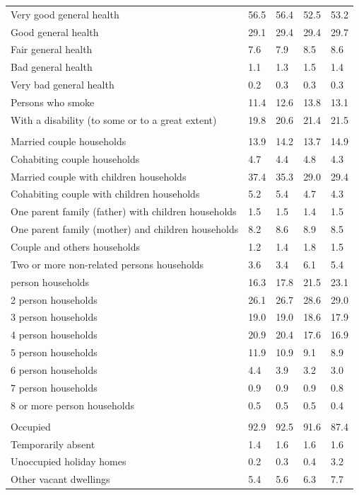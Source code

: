 \documentclass{article}
\begin{document}
\begin{table}[h]
\begin{tabular}{KTTTT}
    \hline
Very good general health & 56.5& 56.4&52.5& 53.2\\
Good general health & 29.1& 29.4& 29.4& 29.7\\
Fair general health & 7.6& 7.9&8.5& 8.6\\
Bad general health & 1.1& 1.3&1.5& 1.4\\
Very bad general health & 0.2& 0.3&0.3& 0.3\\
    \hline
Persons who smoke & 11.4& 12.6&13.8& 13.1\\
    \hline
With a disability (to some or to a great extent) & 19.8& 20.6&21.4& 21.5\\
\hline
    \\ 
    \hline
Married couple households & 13.9& 14.2& 13.7& 14.9\\
Cohabiting couple households & 4.7& 4.4& 4.8& 4.3\\
Married couple with children households & 37.4& 35.3& 29.0& 29.4\\
Cohabiting couple with children households & 5.2& 5.4& 4.7& 4.3\\
One parent family (father) with  children households & 1.5& 1.5& 1.4& 1.5\\
One parent family (mother) and children households & 8.2& 8.6& 8.9& 8.5\\
Couple and others households  & 1.2& 1.4& 1.8& 1.5\\
Two or more non-related persons households & 3.6& 3.4& 6.1& 5.4\\
     person households & 16.3& 17.8& 21.5& 23.1\\
2 person households & 26.1& 26.7& 28.6& 29.0\\
3 person households & 19.0& 19.0& 18.6& 17.9\\
4 person households & 20.9& 20.4& 17.6& 16.9\\
5 person households & 11.9& 10.9&  9.1&  8.9\\
6 person households & 4.4& 3.9& 3.2& 3.0\\
7 person households & 0.9& 0.9& 0.9& 0.8\\
8 or more person households & 0.5& 0.5& 0.5& 0.4\\
\hline
    \\ 
    \hline
Occupied & 92.9& 92.5& 91.6& 87.4\\
Temporarily absent & 1.4& 1.6& 1.6& 1.6\\
Unoccupied holiday homes & 0.2& 0.3& 0.4& 3.2\\
Other vacant dwellings & 5.4& 5.6& 6.3& 7.7\\
\hline
\end{tabular}
\end{table}
\end{document}
